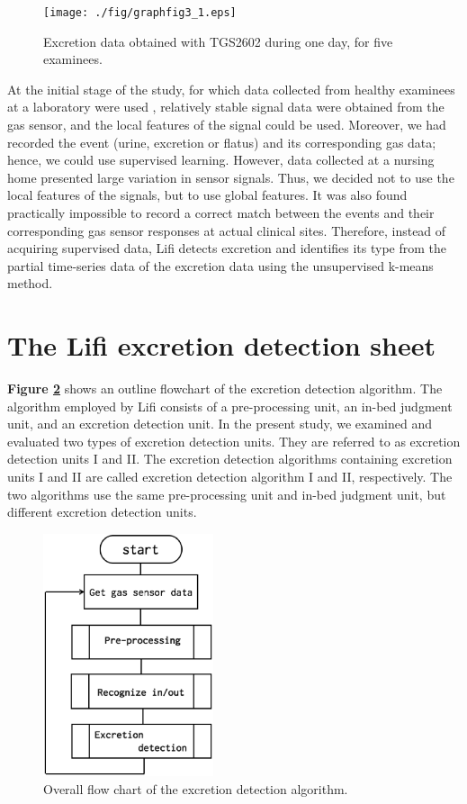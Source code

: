 \documentclass[publish,JRM,paper]{jaciiiarticle}
\begin{document}
\begin{figure}[t]
  \centering
  \texttt{[image: ./fig/graphfig3\_1.eps]}
  \caption{Excretion data obtained with TGS2602 during one day, for five examinees.}
  \label{tgs2602}
\end{figure}
At the initial stage of the study, for which data collected from healthy examinees at a laboratory were used \cite{matsumoto}, relatively stable signal data were obtained from the gas sensor, and the local features of the signal could be used. Moreover, we had recorded the event (urine, excretion or flatus) and its corresponding gas data; hence, we could use supervised learning. However, data collected at a nursing home presented large variation in sensor signals. Thus, we decided not to use the local features of the signals, but to use global features. It was also found practically impossible to record a correct match between the events and their corresponding gas sensor responses at actual clinical sites. Therefore, instead of acquiring supervised data, Lifi detects excretion and identifies its type from the partial time-series data of the excretion data using the unsupervised k-means method.

\section{The Lifi excretion detection sheet}
{\bf Figure \ref{algo_flow}} shows an outline flowchart of the excretion detection algorithm. The algorithm employed by Lifi consists of a pre-processing unit, an in-bed judgment unit, and an excretion detection unit. In the present study, we examined and evaluated two types of excretion detection units. They are referred to as excretion detection units I and I\hspace{-.1em}I. The excretion detection algorithms containing excretion units I and I\hspace{-.1em}I are called excretion detection algorithm I and I\hspace{-.1em}I, respectively. The two algorithms use the same pre-processing unit and in-bed judgment unit, but different excretion detection units.

\begin{figure}[t]
\centering
\includegraphics[width=5cm]{./fig/algoflow.eps}
\caption{Overall flow chart of the excretion detection algorithm.}
\label{algo_flow}
\end{figure}
\end{document}
